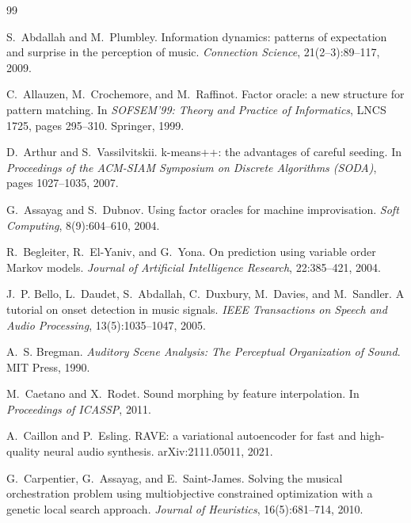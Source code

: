 \documentclass[11pt,a4paper]{article}
\begin{document}
\begin{thebibliography}{99}
\small

S.~Abdallah and M.~Plumbley.
\newblock Information dynamics: patterns of expectation and surprise in the
  perception of music.
\newblock \emph{Connection Science}, 21(2--3):89--117, 2009.

C.~Allauzen, M.~Crochemore, and M.~Raffinot.
\newblock Factor oracle: a new structure for pattern matching.
\newblock In \emph{SOFSEM'99: Theory and Practice of Informatics}, LNCS 1725,
  pages 295--310. Springer, 1999.

D.~Arthur and S.~Vassilvitskii.
\newblock k-means++: the advantages of careful seeding.
\newblock In \emph{Proceedings of the ACM-SIAM Symposium on Discrete
  Algorithms (SODA)}, pages 1027--1035, 2007.

G.~Assayag and S.~Dubnov.
\newblock Using factor oracles for machine improvisation.
\newblock \emph{Soft Computing}, 8(9):604--610, 2004.

R.~Begleiter, R.~El-Yaniv, and G.~Yona.
\newblock On prediction using variable order Markov models.
\newblock \emph{Journal of Artificial Intelligence Research}, 22:385--421,
  2004.

J.~P. Bello, L.~Daudet, S.~Abdallah, C.~Duxbury, M.~Davies, and M.~Sandler.
\newblock A tutorial on onset detection in music signals.
\newblock \emph{IEEE Transactions on Speech and Audio Processing},
  13(5):1035--1047, 2005.

A.~S. Bregman.
\newblock \emph{Auditory Scene Analysis: The Perceptual Organization of
  Sound}.
\newblock MIT Press, 1990.

M.~Caetano and X.~Rodet.
\newblock Sound morphing by feature interpolation.
\newblock In \emph{Proceedings of ICASSP}, 2011.

A.~Caillon and P.~Esling.
\newblock RAVE: a variational autoencoder for fast and high-quality neural
  audio synthesis.
\newblock arXiv:2111.05011, 2021.

G.~Carpentier, G.~Assayag, and E.~Saint-James.
\newblock Solving the musical orchestration problem using multiobjective
  constrained optimization with a genetic local search approach.
\newblock \emph{Journal of Heuristics}, 16(5):681--714, 2010.


\end{thebibliography}
\end{document}
